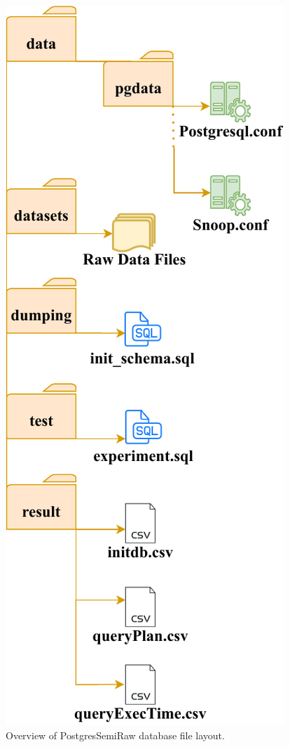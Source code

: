 \begin{figure}[hbt!]
\centering
\includegraphics[width=0.5\linewidth]{img/pgSemiRaw-structure.pdf}
\caption[Overview of PostgresSemiRaw database file layout]{Overview of PostgresSemiRaw database file layout.}
\label{fig:pgSemiRaw-structure}
\end{figure}